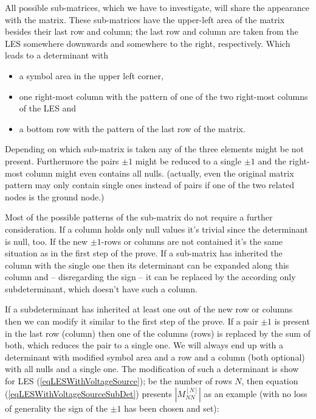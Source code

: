 All possible sub-matrices, which we have to investigate, will share the
appearance with the matrix. These sub-matrices have the upper-left area of
the matrix besides their last row and column; the last row and column are
taken from the LES somewhere downwards and somewhere to the right,
respectively. Which leads to a determinant with

\begin{itemize}
  \item a symbol area in the upper left corner,
  \item one right-most column with the pattern of one of the two
    right-most columns of the LES and
  \item a bottom row with the pattern of the last row of the matrix.
\end{itemize}

Depending on which sub-matrix is taken any of the three elements might be
not present. Furthermore the pairs $\pm 1$ might be reduced to a single
$\pm 1$ and the right-most column might even contains all nulls.
(actually, even the original matrix pattern may only contain single ones
instead of pairs if one of the two related nodes is the ground node.)

Most of the possible patterns of the sub-matrix do not require a further
consideration. If a column holds only null values it's trivial since the
determinant is null, too. If the new $\pm 1$-rows or columns are not
contained it's the same situation as in the first step of the prove. If a
sub-matrix has inherited the column with the single one then its
determinant can be expanded along this column and -- disregarding the sign
-- it can be replaced by the according only subdeterminant, which doesn't
have such a column.

If a subdeterminant has inherited at least one out of the new row or columns
then we can modify it similar to the first step of the prove. If a pair
$\pm 1$ is present in the last row (column) then one of the columns (rows)
is replaced by the sum of both, which reduces the pair to a single one. We
will always end up with a determinant with modified symbol area and a row
and a column (both optional) with all nulls and a single one. The
modification of such a determinant is show for LES
(\ref{eqLESWithVoltageSource}); be the number of rows $N$, then equation
(\ref{eqLESWithVoltageSourceSubDet}) presents $\left|M^{[N]}_{NN}\right|$
as an example (with no loss of generality the sign of the $\pm 1$ has been
chosen and set):

